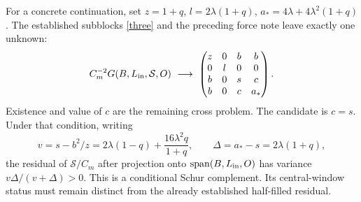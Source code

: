 \documentclass[11pt,a4paper]{article}
\begin{document}
For a concrete continuation, set $z=1+q$, $l=2\lambda(1+q)$,
$a_*=4\lambda+4\lambda^2(1+q)$. The established subblocks
\eqref{three} and the preceding force note leave exactly one unknown:
\begin{equation}
 C_m^{-2}G(B,L_{\rm in},\mathcal S,O)\ \longrightarrow\
 \begin{pmatrix}z&0&b&b\\0&l&0&0\\b&0&s&c\\b&0&c&a_*\end{pmatrix}.
\end{equation}
Existence and value of $c$ are the remaining cross problem.
The candidate is $c=s$. Under that condition, writing
\begin{equation}
 v=s-b^2/z=2\lambda(1-q)+\frac{16\lambda^2q}{1+q},\qquad
 \Delta=a_*-s=2\lambda(1+q),
\end{equation}
the residual of $\mathcal S/C_m$ after projection onto
$\operatorname{span}(B,L_{\rm in},O)$ has variance
$v\Delta/(v+\Delta)>0$. This is a conditional Schur complement.
Its central-window status must remain distinct from the already
established half-filled residual.

\newpage
\end{document}
